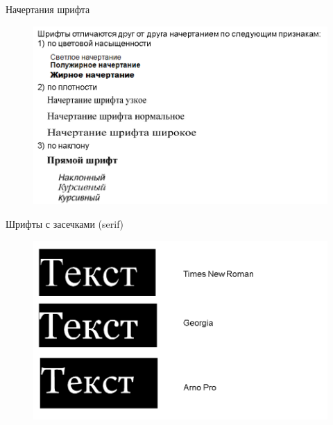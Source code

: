 \documentclass{beamer}
\begin{document}
\begin{frame}[t]{Начертания шрифта}
	\begin{figure}[h]
		\centering
		\includegraphics[scale=0.5]{images/lec05-pic06.png}
	\end{figure}
\end{frame}  

\begin{frame}[t]{Шрифты с засечками (serif)}
	\begin{figure}[h]
		\centering
		\includegraphics[scale=0.5]{images/lec05-pic07.png}
	\end{figure}
\end{frame}  
\end{document}
